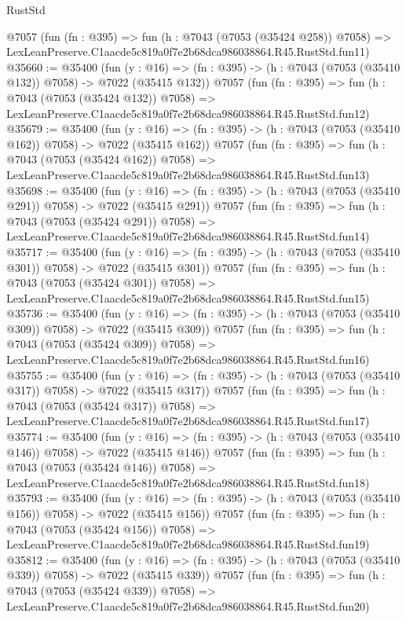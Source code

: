 \begin{lexlean}{RustStd}
\begin{coremodule}
    @7057
    (fun (fn : @395) =>
    fun (h : @7043 (@7053 (@35424 @258)) @7058) =>
    LexLeanPreserve.C1aacde5c819a0f7e2b68dca986038864.R45.RustStd.fun11)
@35660 := @35400
    (fun (y : @16) => (fn : @395) -> (h : @7043 (@7053 (@35410 @132)) @7058) -> @7022 (@35415 @132))
    @7057
    (fun (fn : @395) =>
    fun (h : @7043 (@7053 (@35424 @132)) @7058) =>
    LexLeanPreserve.C1aacde5c819a0f7e2b68dca986038864.R45.RustStd.fun12)
@35679 := @35400
    (fun (y : @16) => (fn : @395) -> (h : @7043 (@7053 (@35410 @162)) @7058) -> @7022 (@35415 @162))
    @7057
    (fun (fn : @395) =>
    fun (h : @7043 (@7053 (@35424 @162)) @7058) =>
    LexLeanPreserve.C1aacde5c819a0f7e2b68dca986038864.R45.RustStd.fun13)
@35698 := @35400
    (fun (y : @16) => (fn : @395) -> (h : @7043 (@7053 (@35410 @291)) @7058) -> @7022 (@35415 @291))
    @7057
    (fun (fn : @395) =>
    fun (h : @7043 (@7053 (@35424 @291)) @7058) =>
    LexLeanPreserve.C1aacde5c819a0f7e2b68dca986038864.R45.RustStd.fun14)
@35717 := @35400
    (fun (y : @16) => (fn : @395) -> (h : @7043 (@7053 (@35410 @301)) @7058) -> @7022 (@35415 @301))
    @7057
    (fun (fn : @395) =>
    fun (h : @7043 (@7053 (@35424 @301)) @7058) =>
    LexLeanPreserve.C1aacde5c819a0f7e2b68dca986038864.R45.RustStd.fun15)
@35736 := @35400
    (fun (y : @16) => (fn : @395) -> (h : @7043 (@7053 (@35410 @309)) @7058) -> @7022 (@35415 @309))
    @7057
    (fun (fn : @395) =>
    fun (h : @7043 (@7053 (@35424 @309)) @7058) =>
    LexLeanPreserve.C1aacde5c819a0f7e2b68dca986038864.R45.RustStd.fun16)
@35755 := @35400
    (fun (y : @16) => (fn : @395) -> (h : @7043 (@7053 (@35410 @317)) @7058) -> @7022 (@35415 @317))
    @7057
    (fun (fn : @395) =>
    fun (h : @7043 (@7053 (@35424 @317)) @7058) =>
    LexLeanPreserve.C1aacde5c819a0f7e2b68dca986038864.R45.RustStd.fun17)
@35774 := @35400
    (fun (y : @16) => (fn : @395) -> (h : @7043 (@7053 (@35410 @146)) @7058) -> @7022 (@35415 @146))
    @7057
    (fun (fn : @395) =>
    fun (h : @7043 (@7053 (@35424 @146)) @7058) =>
    LexLeanPreserve.C1aacde5c819a0f7e2b68dca986038864.R45.RustStd.fun18)
@35793 := @35400
    (fun (y : @16) => (fn : @395) -> (h : @7043 (@7053 (@35410 @156)) @7058) -> @7022 (@35415 @156))
    @7057
    (fun (fn : @395) =>
    fun (h : @7043 (@7053 (@35424 @156)) @7058) =>
    LexLeanPreserve.C1aacde5c819a0f7e2b68dca986038864.R45.RustStd.fun19)
@35812 := @35400
    (fun (y : @16) => (fn : @395) -> (h : @7043 (@7053 (@35410 @339)) @7058) -> @7022 (@35415 @339))
    @7057
    (fun (fn : @395) =>
    fun (h : @7043 (@7053 (@35424 @339)) @7058) =>
    LexLeanPreserve.C1aacde5c819a0f7e2b68dca986038864.R45.RustStd.fun20)

\end{coremodule}
\end{lexlean}
